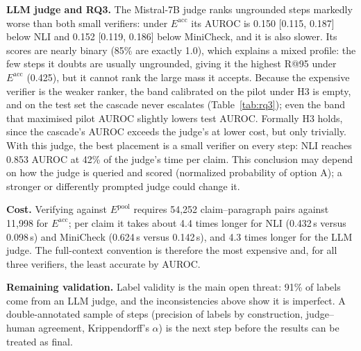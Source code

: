 \documentclass[conference]{IEEEtran}
\newcommand{\Eacc}{E^{\mathrm{acc}}}
\newcommand{\Epool}{E^{\mathrm{pool}}}
\begin{document}
\textbf{LLM judge and RQ3.} The Mistral-7B judge ranks ungrounded steps markedly worse than both small verifiers: under $\Eacc$ its AUROC is 0.150 [0.115, 0.187] below NLI and 0.152 [0.119, 0.186] below MiniCheck, and it is also slower. Its scores are nearly binary (85\% are exactly 1.0), which explains a mixed profile: the few steps it doubts are usually ungrounded, giving it the highest R@95 under $\Eacc$ (0.425), but it cannot rank the large mass it accepts. Because the expensive verifier is the weaker ranker, the band calibrated on the pilot under H3 is empty, and on the test set the cascade never escalates (Table~\ref{tab:rq3}); even the band that maximised pilot AUROC slightly lowers test AUROC. Formally H3 holds, since the cascade's AUROC exceeds the judge's at lower cost, but only trivially. With this judge, the best placement is a small verifier on every step: NLI reaches 0.853 AUROC at 42\% of the judge's time per claim. This conclusion may depend on how the judge is queried and scored (normalized probability of option A); a stronger or differently prompted judge could change it.

\textbf{Cost.} Verifying against $\Epool$ requires 54,252 claim--paragraph pairs against 11,998 for $\Eacc$; per claim it takes about 4.4 times longer for NLI (0.432\,s versus 0.098\,s) and MiniCheck (0.624\,s versus 0.142\,s), and 4.3 times longer for the LLM judge. The full-context convention is therefore the most expensive and, for all three verifiers, the least accurate by AUROC.

\textbf{Remaining validation.} Label validity is the main open threat: 91\% of labels come from an LLM judge, and the inconsistencies above show it is imperfect. A double-annotated sample of steps (precision of labels by construction, judge--human agreement, Krippendorff's $\alpha$) is the next step before the results can be treated as final.
\end{document}
